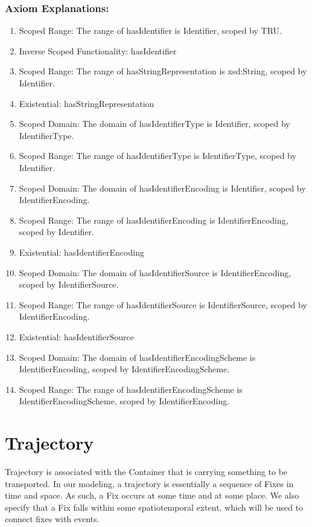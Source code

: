 \subsubsection*{Axiom Explanations:}
\begin{enumerate}
    \item Scoped Range: The range of \textsf{hasIdentifier} is \textsf{Identifier}, scoped by \textsf{TRU}.
    \item Inverse Scoped Functionality: \textsf{hasIdentifier}
    \item Scoped Range: The range of \textsf{hasStringRepresentation} is \textsf{xsd:String}, scoped by \textsf{Identifier}.
    \item Existential: \textsf{hasStringRepresentation}
    \item Scoped Domain: The domain of \textsf{hasIdentifierType} is \textsf{Identifier}, scoped by \textsf{IdentifierType}.
    \item Scoped Range: The range of \textsf{hasIdentifierType} is \textsf{IdentifierType}, scoped by \textsf{Identifier}.
    \item Scoped Domain: The domain of \textsf{hasIdentifierEncoding} is \textsf{Identifier}, scoped by \textsf{IdentifierEncoding}.
    \item Scoped Range: The range of \textsf{hasIdentifierEncoding} is \textsf{IdentifierEncoding}, scoped by \textsf{Identifier}.
    \item Existential: \textsf{hasIdentifierEncoding}
    \item Scoped Domain: The domain of \textsf{hasIdentifierSource} is \textsf{IdentifierEncoding}, scoped by \textsf{IdentifierSource}.
    \item Scoped Range: The range of \textsf{hasIdentifierSource} is \textsf{IdentifierSource}, scoped by \textsf{IdentifierEncoding}.
    \item Existential: \textsf{hasIdentifierSource}
    \item Scoped Domain: The domain of \textsf{hasIdentifierEncodingScheme} is \textsf{IdentifierEncoding}, scoped by \textsf{IdentifierEncodingScheme}.
    \item Scoped Range: The range of \textsf{hasIdentifierEncodingScheme} is \textsf{IdentifierEncodingScheme}, scoped by \textsf{IdentifierEncoding}.
\end{enumerate}

\section{Trajectory}
\label{ssec:trajectory}
Trajectory is associated with the Container that is carrying something to be transported. In our modeling, a trajectory is essentially a sequence of Fixes in time and space. As such, a Fix occurs at some time and at some place. We also specify that a Fix falls within some spatiotemporal extent, which will be used to connect fixes with events.

